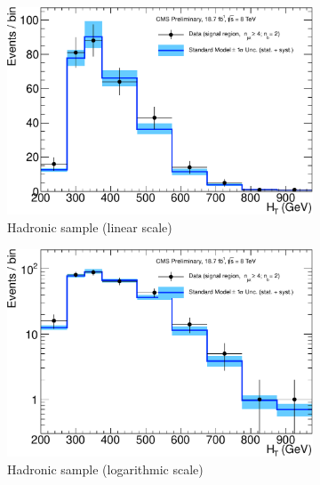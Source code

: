 \clearpage
\begin{figure}[h!]
  \centering
  \begin{subfigure}[b]{0.48\textwidth}
    \includegraphics[width=\textwidth]
    {Figs/results/v0/blueBand/single_plots/hadronic_2b_ge4j.pdf}
    \caption{Hadronic sample (linear scale)}
  \end{subfigure}
  \vspace{0.7cm}\begin{subfigure}[b]{0.48\textwidth}
    \includegraphics[width=\textwidth]
    {Figs/results/v0/blueBand/single_plots/hadronic_2b_ge4j_logy.pdf}
    \caption{Hadronic sample (logarithmic scale)}
  \end{subfigure}
  \begin{subfigure}[b]{0.48\textwidth}

\end{subfigure}
\end{figure}

